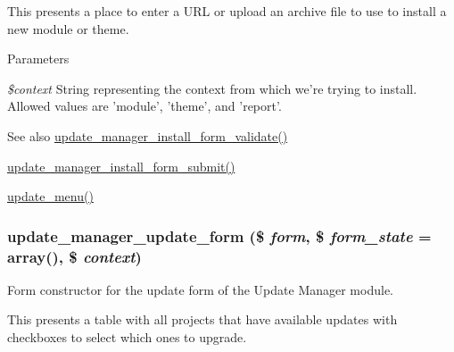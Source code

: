 This presents a place to enter a URL or upload an archive file to use to install a new module or theme.


\begin{DoxyParams}{Parameters}
\item[{\em \$context}]String representing the context from which we're trying to install. Allowed values are 'module', 'theme', and 'report'.\end{DoxyParams}
\begin{DoxySeeAlso}{See also}
\hyperlink{group__update__manager__install_ga56ab9860e1bc481b261a24c6ef480f75}{update\_\-manager\_\-install\_\-form\_\-validate()} 

\hyperlink{group__update__manager__install_ga52e9f2cddddddccf921284b01f9505b0}{update\_\-manager\_\-install\_\-form\_\-submit()} 

\hyperlink{update_8module_abfea1a759334c0461fa9ff2250bdfaaf}{update\_\-menu()} 
\end{DoxySeeAlso}
\hypertarget{group__forms_ga0fa2e185b0bcbac10f995d964a199c65}{
\subsubsection[{update\_\-manager\_\-update\_\-form}]{\setlength{\rightskip}{0pt plus 5cm}update\_\-manager\_\-update\_\-form (\$ {\em form}, \/  \$ {\em form\_\-state} = {\ttfamily array()}, \/  \$ {\em context})}}
\label{group__forms_ga0fa2e185b0bcbac10f995d964a199c65}
Form constructor for the update form of the Update Manager module.

This presents a table with all projects that have available updates with checkboxes to select which ones to upgrade.


